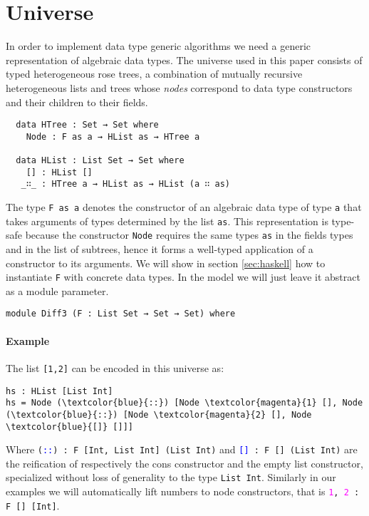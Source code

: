 \documentclass[preprint]{sigplanconf}
\begin{document}
\section{Universe}
In order to implement data type generic algorithms we need a generic
representation of algebraic data types.
%
The universe used in this paper consists of typed heterogeneous rose
trees, a combination of mutually recursive heterogeneous lists and
trees whose \emph{nodes} correspond to data type constructors and
their children to their fields.
\begin{verbatim}
  data HTree : Set → Set where
    Node : F as a → HList as → HTree a

  data HList : List Set → Set where
    [] : HList []
   _∷_ : HTree a → HList as → HList (a ∷ as)
\end{verbatim}
	The type \texttt{F as a} denotes the constructor of an algebraic data
	type of type \texttt{a} that takes arguments of types determined by the list 
	\texttt{as}.
        This representation is type-safe because the constructor
        \texttt{Node} requires the same types \texttt{as} in the
        fields types and in the list of subtrees, hence it forms a
        well-typed application of a constructor to its arguments.
	We will show in section \ref{sec:haskell} how to instantiate \texttt{F} with concrete 
        data types. In the model we will just leave it abstract as a module parameter.
\begin{verbatim}
module Diff3 (F : List Set → Set → Set) where
\end{verbatim}
	
        \paragraph{Example} 
        The list \texttt{[1,2]} can be encoded in this universe as: 
\begin{Verbatim}[commandchars=\\\{\}]
hs : HList [List Int]
hs = Node (\textcolor{blue}{::}) [Node \textcolor{magenta}{1} [], Node (\textcolor{blue}{::}) [Node \textcolor{magenta}{2} [], Node \textcolor{blue}{[]} []]]
\end{Verbatim}
        Where \texttt{(\textcolor{blue}{::}) : F [Int, List Int] (List Int)}
        and \texttt{\textcolor{blue}{[]} : F [] (List Int)} are the reification of respectively the cons constructor and the
        empty list constructor, specialized without loss of generality to the type \texttt{List Int}.
        Similarly in our examples we will automatically lift numbers to node constructors, that is
        \texttt{\textcolor{magenta}{1}, \textcolor{magenta}{2} : F [] [Int]}.
\end{document}
